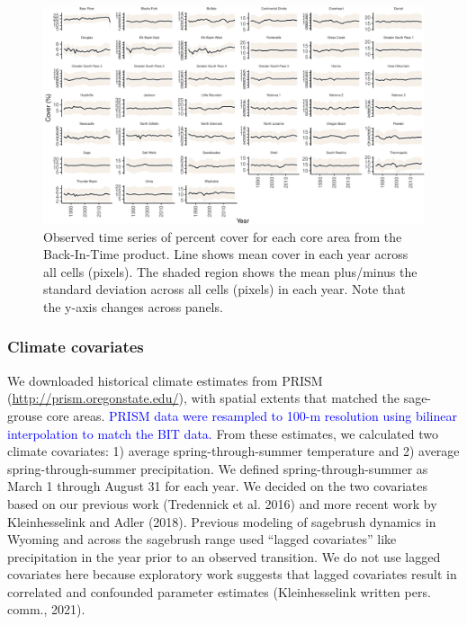 \documentclass[
  12pt,
]{article}
\begin{document}
\begin{figure}
\centering
\includegraphics{sageCastManuscript_files/figure-latex/data-1.pdf}
\caption{\label{fig:data}Observed time series of percent cover for each core area from the Back-In-Time product. Line shows mean cover in each year across all cells (pixels). The shaded region shows the mean plus/minus the standard deviation across all cells (pixels) in each year. Note that the y-axis changes across panels.}
\end{figure}

\hypertarget{climate-covariates}{%
\subsubsection{Climate covariates}\label{climate-covariates}}

We downloaded historical climate estimates from PRISM (\url{http://prism.oregonstate.edu/}), with spatial extents that matched the sage-grouse core areas.
\textcolor{blue}{PRISM data were resampled to 100-m resolution using bilinear interpolation to match the BIT data.}
From these estimates, we calculated two climate covariates: 1) average spring-through-summer temperature and 2) average spring-through-summer precipitation.
We defined spring-through-summer as March 1 through August 31 for each year.
We decided on the two covariates based on our previous work (Tredennick et al. 2016) and more recent work by Kleinhesselink and Adler (2018).
Previous modeling of sagebrush dynamics in Wyoming and across the sagebrush range used ``lagged covariates'' like precipitation in the year prior to an observed transition.
We do not use lagged covariates here because exploratory work suggests that lagged covariates result in correlated and confounded parameter estimates (Kleinhesselink written pers. comm., 2021).
\end{document}
